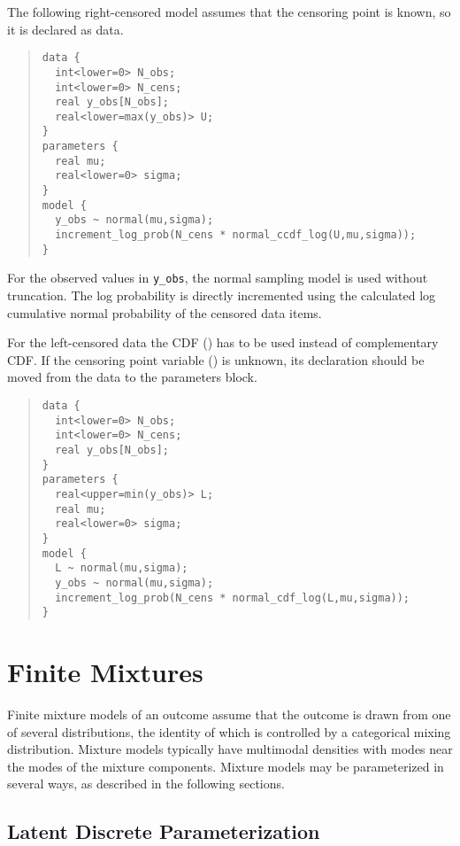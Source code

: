 The following right-censored model assumes
that the censoring point is known, so it is declared as data.
%
\begin{quote}
\begin{Verbatim}[fontsize=\small]
data {
  int<lower=0> N_obs;
  int<lower=0> N_cens;
  real y_obs[N_obs];
  real<lower=max(y_obs)> U;
}
parameters {
  real mu;
  real<lower=0> sigma;
}
model {
  y_obs ~ normal(mu,sigma); 
  increment_log_prob(N_cens * normal_ccdf_log(U,mu,sigma));
}
\end{Verbatim}
\end{quote}
%
For the observed values in \Verb|y_obs|, the normal sampling model is
used without truncation.  The log probability is directly incremented
using the calculated log cumulative normal probability of the censored
data items.

For the left-censored data the CDF
() has to be used instead of complementary CDF.
If the censoring point variable () is unknown,
its declaration should be moved from the data to the parameters block. 
%
\begin{quote}
\begin{Verbatim}[fontsize=\small]
data {
  int<lower=0> N_obs;
  int<lower=0> N_cens;
  real y_obs[N_obs];
}
parameters {
  real<upper=min(y_obs)> L;
  real mu;
  real<lower=0> sigma;
}
model {
  L ~ normal(mu,sigma);
  y_obs ~ normal(mu,sigma);
  increment_log_prob(N_cens * normal_cdf_log(L,mu,sigma));
}
\end{Verbatim}
\end{quote}
%

\chapter{Finite Mixtures}\label{mixture-modeling.chapter}

\noindent
Finite mixture models of an outcome assume that the outcome is drawn
from one of several distributions, the identity of which is controlled
by a categorical mixing distribution. Mixture models typically have
multimodal densities with modes near the modes of the mixture
components.  Mixture models may be parameterized in several ways, as
described in the following sections.


\section{Latent Discrete Parameterization}

